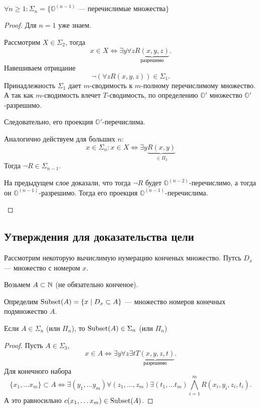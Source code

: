 \begin{thm}
	$  \forall n \ge 1 \colon \Sigma _n = \{\mathbb{O}^{(n-1)} \text{ --- перечислимые множества}\}$
\end{thm}
\begin{proof}
    Для $ n = 1$ уже знаем.
	\begin{description}
	    \item \boxed{  \subset } 
			Рассмотрим $ X \in \Sigma _2$, тогда
			\[
				x \in X \Longleftrightarrow \exists y \forall z \underbrace{R(x, y,z)}_{ \text{разрешимо}}
			.\] 
			Навешиваем отрицание
			\[
				\neg \left( \forall z R(x, y, z) \right)  \in \Sigma _1
			.\] 
			Принадлежность $  \Sigma _1$ дает $ m$-сводимость к $ m$-полному перечислимому множество. А так как $ m$-сводимость влечет $ T$-сводимость, по определению $ \mathbb{O}'$ множество  $ \mathbb{O}'$-разрешимо.

			Следовательно, его проекция $ \mathbb{O}'$-перечислима.

			Аналогично действуем для больших  $ n$: 
			\[ x \in \Sigma_n\colon x \in X \Longleftrightarrow \exists y \underbrace{R(x, y)}_{ \in \Pi _2}\]
			Тогда $ \neg R \in \Sigma _{n-1} .$ 

		На предыдущем слое доказали, что тогда $ \neg R $ будет $ \mathbb{O}^{(n-2)}$-перечислимо, а тогда он $ \mathbb{O}^{(n-1)}$-разрешимо. Тогда его проекция $ \mathbb{O}^{(n-1)}$-перечислима.
	    \item \boxed{\supset } 

	\end{description} 
\end{proof}

\subsection{Утверждения для доказательства цели}
\begin{defn}
    Рассмотрим некоторую вычислимую нумерацию конченых множество. Путсь $ D_x$ --- множество с номером  $ x$.

	Возьмем $ A \subset \mathbb{N}$ (не обязательно конченое).

	Определим $ \operatorname{Subset}(A) = \{x \mid D_x \subset A\}$ --- множество номеров конечных подмножество $ A$.
\end{defn}
\begin{lm}[о $ \Subsetm$]
	Если $ A \in \Sigma_n$ (или $ \Pi_n$), то  $ \operatorname{Subset}(A) \in \Sigma_n$ (или $ \Pi_n$)
\end{lm}
\begin{proof}
	Пусть $ A \in \Sigma_3$,
	\[
	x \in A \Longleftrightarrow \exists y \forall z \exists t \underbrace{T(x, y, z, t)}_{\text{разрешимо}}
	.\] 
	Для конечного набора
	\[
		\{x_1, \ldots x_m\} \subset A \Longleftrightarrow \exists (y_1, \ldots y_m) \forall (z_1, \ldots , z_m) \exists (t_1, \ldots t_m) \bigwedge_{i=1}^{m} R(x_i, y_i, z_i, t_i)
	.\] 
	А это равносильно $ c(x_1, \ldots x_m) \in \operatorname{Subset}(A)$.
\end{proof}

